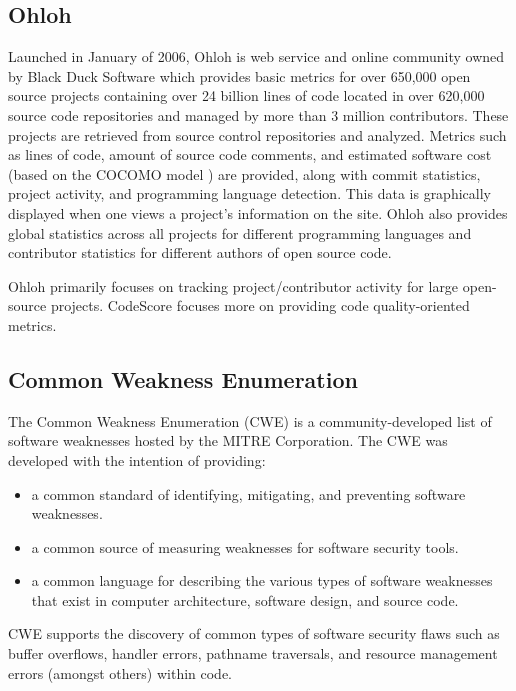 \documentclass{sig-alternate}
\begin{document}
\subsection{Ohloh}
Launched in January of 2006, Ohloh \cite{allen2009ohloh} is web service and
online community owned by Black Duck Software which provides basic metrics for
over 650,000 open source projects containing over 24 billion lines of code
located in over 620,000 source code repositories and managed by more than
3 million contributors. These projects are retrieved from source control
repositories and analyzed. Metrics such as lines of code, amount of source code
comments, and estimated software cost (based on the COCOMO model
\cite{boehm2000software}) are provided, along with commit statistics, project
activity, and programming language detection. This data is graphically displayed
when one views a project's information on the site. Ohloh also provides global
statistics across all projects for different programming languages and
contributor statistics for different authors of open source code. 

Ohloh primarily focuses on tracking project/contributor activity for large
open-source projects. CodeScore focuses more on providing code quality-oriented
metrics.

\subsection{Common Weakness Enumeration}
The Common Weakness Enumeration (CWE) \cite{mitre2006cwe} is a
community-developed list of software weaknesses hosted by the MITRE Corporation.
The CWE was developed with the intention of providing:

\begin{itemize}
	\item a common standard of identifying, mitigating, and preventing software weaknesses.
	\item a common source of measuring weaknesses for software security tools.
	\item a common language for describing the various types of software
		weaknesses that exist in computer architecture, software design, and
		source code.
\end{itemize}

CWE supports the discovery of common types of software security flaws such as
buffer overflows, handler errors, pathname traversals, and resource management
errors (amongst others) within code.
\end{document}
